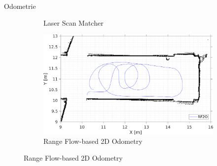 \documentclass{beamer}
\begin{document}
\begin{frame}{Odometrie}
\begin{figure}
\begin{subfigure}{0.4\linewidth}
			\caption{Laser Scan Matcher}
		\end{subfigure}
		\hfill
		\begin{subfigure}{0.4\linewidth}
			\centering
			\includegraphics[width=\linewidth]{Record_2018-02-08-12-33-53_trajectory4}
			\caption{Range Flow-based 2D Odometry}
		\end{subfigure}
	\end{figure}

\end{frame}
\end{document}
